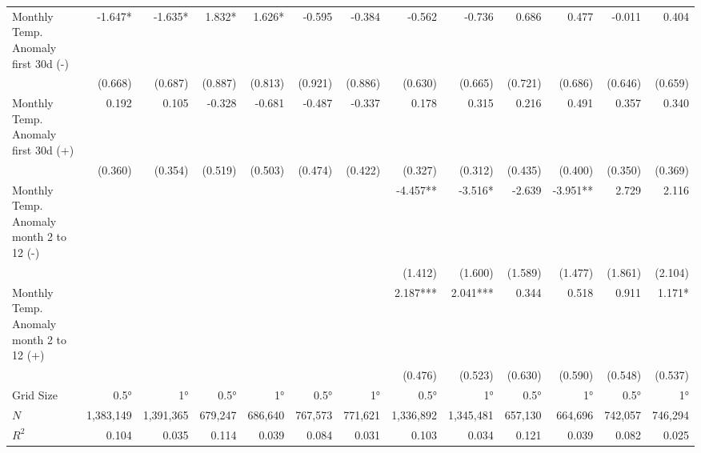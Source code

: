 \begin{table}[H]
\begin{adjustbox}{max width=\linewidth}
\begin{tabular}{lrrrrrrrrrrrr}
    Monthly Temp. Anomaly first 30d   (-)       &      -1.647* &     -1.635* &      1.832* &       1.626* &     -0.595   &      -0.384 &    -0.562 &      -0.736 &         0.686 &        0.477 &       -0.011 &        0.404 \\ 
                                                &      (0.668) &     (0.687) &     (0.887) &      (0.813) &    (0.921)   &     (0.886) &   (0.630) &     (0.665) &       (0.721) &      (0.686) &      (0.646) &      (0.659) \\ 
    Monthly Temp. Anomaly first 30d (+)         &        0.192 &       0.105 &      -0.328 &       -0.681 &     -0.487   &      -0.337 &     0.178 &       0.315 &         0.216 &        0.491 &        0.357 &        0.340 \\ 
                                                &      (0.360) &     (0.354) &     (0.519) &      (0.503) &    (0.474)   &     (0.422) &   (0.327) &     (0.312) &       (0.435) &      (0.400) &      (0.350) &      (0.369) \\ 
    Monthly Temp. Anomaly month 2 to 12 (-)     &              &             &             &              &              &             &  -4.457** &     -3.516* &        -2.639 &     -3.951** &        2.729 &        2.116 \\ 
                                                &              &             &             &              &              &             &   (1.412) &     (1.600) &       (1.589) &      (1.477) &      (1.861) &      (2.104) \\ 
    Monthly Temp. Anomaly month 2 to 12 (+)     &              &             &             &              &              &             &  2.187*** &    2.041*** &         0.344 &        0.518 &        0.911 &       1.171* \\ 
                                                &              &             &             &              &              &             &   (0.476) &     (0.523) &       (0.630) &      (0.590) &      (0.548) &      (0.537) \\ 
    \midrule 
    Grid Size                                   &       0.5°  &      1°     &        0.5°  &       1°     &       0.5°   &      1°     &     0.5°  &       1°     &        0.5°  &      1°      &        0.5°   &      1°     \\ 
    $N$                                         &   1,383,149 &   1,391,365 &      679,247 &     686,640  &     767,573  &     771,621 & 1,336,892 &    1,345,481 &      657,130 &      664,696 &       742,057 &      746,294 \\ 
    $R^2$                                       &       0.104 &       0.035 &        0.114 &       0.039  &       0.084  &       0.031 &     0.103 &        0.034 &        0.121 &        0.039 &         0.082 &        0.025 \\  
    \bottomrule
\end{tabular}
\end{adjustbox}
\end{table}